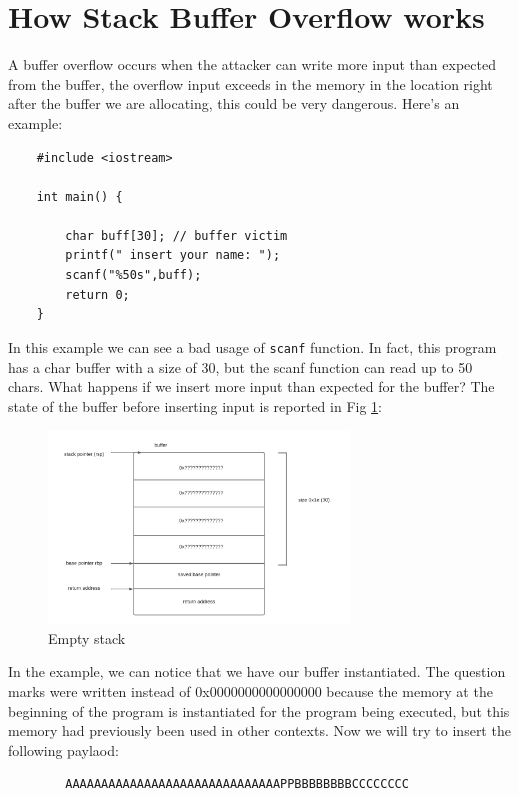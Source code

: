     \section{How Stack Buffer Overflow works}
    A buffer overflow occurs when the attacker can write more input than expected from the buffer, the overflow input exceeds in the memory in the location right after the buffer we are allocating, this could be very dangerous.\newline
    Here's an example:
    \begin{verbatim}
    #include <iostream>
    
    int main() {
    
        char buff[30]; // buffer victim 
        printf(" insert your name: ");
        scanf("%50s",buff); 
        return 0;
    }
    \end{verbatim}
    In this example we can see a bad usage of \texttt{scanf} function. In fact, this program has a char buffer with a size of 30, but the scanf function can read up to 50 chars.\newline 
    What happens if we insert more input than expected for the buffer?\newline
    The state of the buffer before inserting input is reported in Fig \ref{fig:example_empty_buffer}:\newline
    \begin{figure}[h]
    \centering
    \includegraphics[width=8cm]{Images/chunk_wout_cacnary.png}
    \caption{Empty stack}
    \label{fig:example_empty_buffer}
    \end{figure}
       \clearpage
    In the example, we can notice that we have our buffer instantiated.\newline
    The question marks were written instead of 0x0000000000000000 because the memory at the beginning of the program is instantiated for the program being executed, but this memory had previously been used in other contexts.\newline
    Now we will try to insert the following paylaod:
    \begin{verbatim}
        AAAAAAAAAAAAAAAAAAAAAAAAAAAAAAPPBBBBBBBBCCCCCCCC
    \end{verbatim}
   
